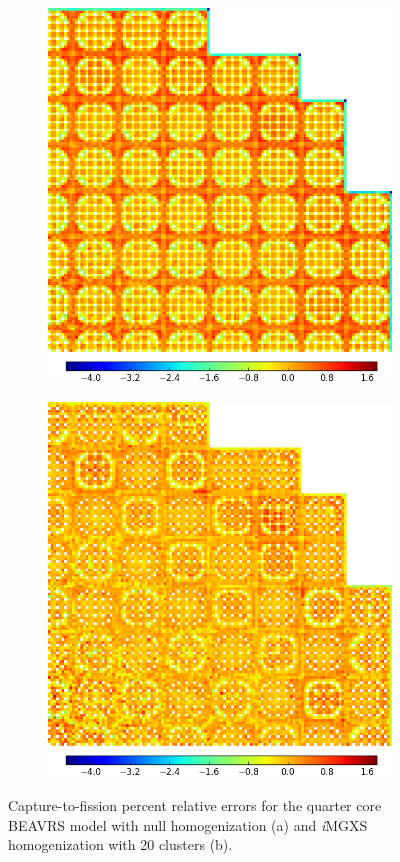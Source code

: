 \documentclass[12pt,twoside]{mitthesis-exec}
\begin{document}
\begin{figure}[h!]
\centering
\begin{subfigure}{0.9\textwidth}
  \centering
  \includegraphics[width=0.65\linewidth]{figures/results/capt-to-fiss/spatial/full-core/capt-to-fiss-err-null}
  \caption{}
  \label{fig:chap11-full-core-capt-err-null}
\end{subfigure}
\begin{subfigure}{0.9\textwidth}
  \centering
\includegraphics[width=0.65\linewidth]{figures/results/capt-to-fiss/spatial/full-core/capt-to-fiss-err-birch-40}
  \caption{}
  \label{fig:chap11-full-core-capt-err-birch-40}
\end{subfigure}
\caption[Capture-to-fission ratio errors for BEAVRS]{Capture-to-fission percent relative errors for the quarter core BEAVRS model with null homogenization (a) and \textit{i}MGXS homogenization with 20 clusters (b).}
\label{fig:chap11-full-core-capt-err-b}
\end{figure}
\end{document}
